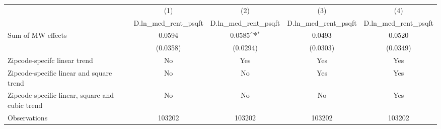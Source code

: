 {
\def\sym#1{\ifmmode^{#1}\else\(^{#1}\)\fi}
\begin{tabular}{l*{4}{c}}
\hline\hline
          &\multicolumn{1}{c}{(1)}&\multicolumn{1}{c}{(2)}&\multicolumn{1}{c}{(3)}&\multicolumn{1}{c}{(4)}\\
          &\multicolumn{1}{c}{D.ln\_med\_rent\_psqft}&\multicolumn{1}{c}{D.ln\_med\_rent\_psqft}&\multicolumn{1}{c}{D.ln\_med\_rent\_psqft}&\multicolumn{1}{c}{D.ln\_med\_rent\_psqft}\\
\hline
Sum of MW effects&   0.0594         &   0.0585\sym{*}  &   0.0493         &   0.0520         \\
          & (0.0358)         & (0.0294)         & (0.0303)         & (0.0349)         \\
\hline
Zipcode-specifc linear trend&       No         &      Yes         &      Yes         &      Yes         \\
Zipcode-specific linear and square trend&       No         &       No         &      Yes         &      Yes         \\
Zipcode-specific linear, square and cubic trend&       No         &       No         &       No         &      Yes         \\
Observations&   103202         &   103202         &   103202         &   103202         \\
\hline\hline
\end{tabular}
}
